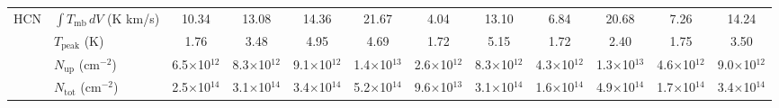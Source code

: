\documentclass{aa}
\begin{document}
\begin{appendix}
\begin{sidewaystable*}
\begin{tabular}{l l c c c c c c c c c c}
\multirow{4}{*}{HCN} & $\int{T_{\mathrm{mb}} \, dV}$ (K km/s) & 10.34 & 13.08 & 14.36 & 21.67 & 4.04 & 13.10 & 6.84 & 20.68 & 7.26 & 14.24 \\
& $T_\mathrm{peak}$ (K) & 1.76 & 3.48 & 4.95 & 4.69 & 1.72 & 5.15 & 1.72 & 2.40 & 1.75 & 3.50 \\
& $N_\mathrm{up}$ (cm$^{-2}$) & 6.5$\times$10$^{12}$ & 8.3$\times$10$^{12}$ & 9.1$\times$10$^{12}$ & 1.4$\times$10$^{13}$ & 2.6$\times$10$^{12}$ & 8.3$\times$10$^{12}$ & 4.3$\times$10$^{12}$ & 1.3$\times$10$^{13}$ & 4.6$\times$10$^{12}$ & 9.0$\times$10$^{12}$ \\
& $N_\mathrm{tot}$ (cm$^{-2}$) & 2.5$\times$10$^{14}$ & 3.1$\times$10$^{14}$ & 3.4$\times$10$^{14}$ & 5.2$\times$10$^{14}$ & 9.6$\times$10$^{13}$ & 3.1$\times$10$^{14}$ & 1.6$\times$10$^{14}$ & 4.9$\times$10$^{14}$ & 1.7$\times$10$^{14}$ & 3.4$\times$10$^{14}$\\

\hline\hline
\end{tabular}
\end{sidewaystable*}



\end{appendix}
\end{document}

